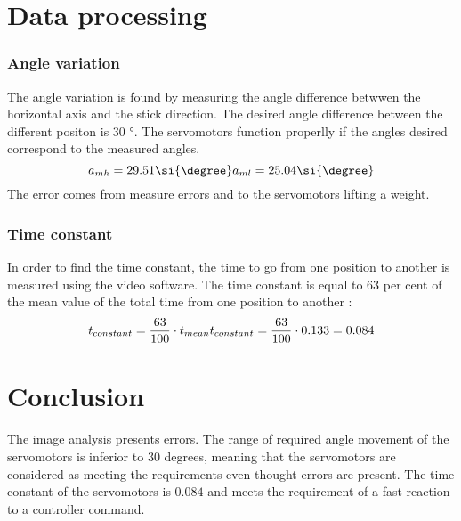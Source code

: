 \section*{Data processing}	

\subsubsection*{Angle variation}

The angle variation is found by measuring the angle difference betwwen the horizontal axis and the stick direction. The desired angle difference between the different positon is $30$ \si{\degree}. The servomotors function properlly if the angles desired correspond to the measured angles.
\begin{equation}
a_{mh} = 29.51 \si{\degree} \\  
a_{ml} = 25.04 \si{\degree}\\ 
\end{equation}
\startexplain
{}
\stopexplain
The error comes from measure errors and to the servomotors lifting a weight.

\subsubsection*{Time constant}

In order to find the time constant, the time to go from one position to another is measured using the video software. The time constant is equal to 63 per cent of the mean value of the total time from one position to another : 
\begin{equation}
t_{constant} = \frac{63}{100} \cdot t_{mean} \\
t_{constant} = \frac{63}{100} \cdot 0.133 = 0.084
\end{equation} 
\startexplain
{}
\stopexplain




\section*{Conclusion}

The image analysis presents errors. The range of required angle movement of the servomotors is inferior to $30$ degrees, meaning that the servomotors are considered as meeting the requirements even thought errors are present. The time constant of the servomotors is $0.084$ and meets the requirement of a fast reaction to a controller command.




